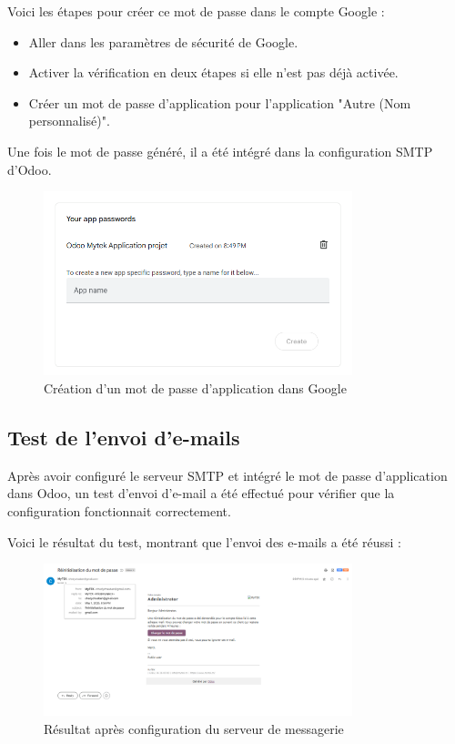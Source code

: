 \documentclass[12pt]{report}
\begin{document}
Voici les étapes pour créer ce mot de passe dans le compte Google :

\begin{itemize}
    \item Aller dans les paramètres de sécurité de Google.
    \item Activer la vérification en deux étapes si elle n'est pas déjà activée.
    \item Créer un mot de passe d’application pour l'application "Autre (Nom personnalisé)".
\end{itemize}

Une fois le mot de passe généré, il a été intégré dans la configuration SMTP d'Odoo.

\begin{figure}[H]
\centering
\includegraphics[width=0.8\textwidth]{images/google.PNG}
\caption{Création d’un mot de passe d’application dans Google}
\end{figure}

\subsection{Test de l'envoi d'e-mails}

Après avoir configuré le serveur SMTP et intégré le mot de passe d’application dans Odoo, un test d'envoi d'e-mail a été effectué pour vérifier que la configuration fonctionnait correctement.

Voici le résultat du test, montrant que l’envoi des e-mails a été réussi :

\begin{figure}[H]
\centering
\includegraphics[width=0.8\textwidth]{images/MailOK.PNG}
\caption{Résultat après configuration du serveur de messagerie}
\end{figure}
\end{document}

